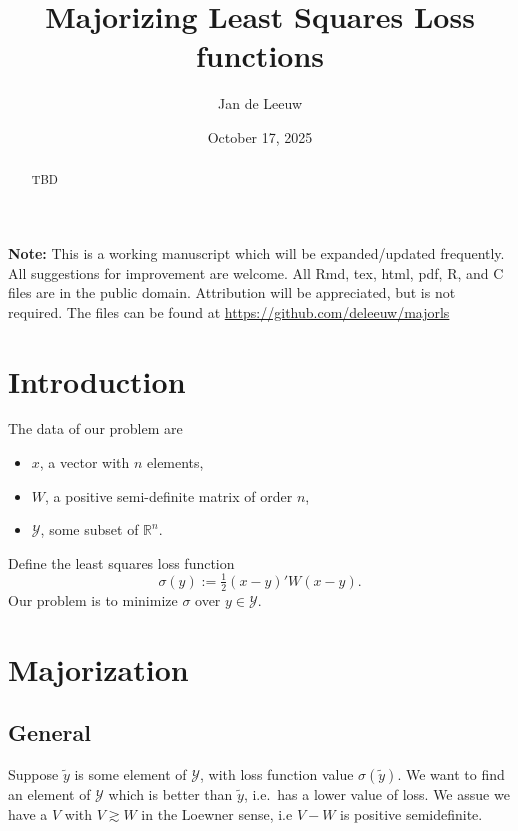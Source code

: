 \documentclass[
  12pt,
  letterpaper,
  DIV=11,
  numbers=noendperiod]{scrartcl}
\title{Majorizing Least Squares Loss functions}
\author{Jan de Leeuw}
\date{October 17, 2025}
\providecommand{\tightlist}{%
  \setlength{\itemsep}{0pt}\setlength{\parskip}{0pt}}
\newcommand{\sectionbreak}{\clearpage}
\renewcommand*\contentsname{Table of contents}
\newcommand\contentsname{Table of contents}
\theoremstyle{plain}
\theoremstyle{remark}
\begin{document}
\maketitle
\begin{abstract}
TBD
\end{abstract}

\renewcommand*\contentsname{Table of contents}
{
\hypersetup{linkcolor=}
\setcounter{tocdepth}{3}
\tableofcontents
}

\sectionbreak

\textbf{Note:} This is a working manuscript which will be
expanded/updated frequently. All suggestions for improvement are
welcome. All Rmd, tex, html, pdf, R, and C files are in the public
domain. Attribution will be appreciated, but is not required. The files
can be found at \url{https://github.com/deleeuw/majorls}

\sectionbreak

\section{Introduction}\label{introduction}

The data of our problem are

\begin{itemize}
\tightlist
\item
  \(x\), a vector with \(n\) elements,
\item
  \(W\), a positive semi-definite matrix of order \(n\),
\item
  \(\mathcal{Y}\), some subset of \(\mathbb{R}^n\).
\end{itemize}

Define the least squares loss function \[
\sigma(y):=\tfrac12(x-y)'W(x-y).
\] Our problem is to minimize \(\sigma\) over \(y\in\mathcal{Y}\).

\sectionbreak

\section{Majorization}\label{majorization}

\subsection{General}\label{general}

Suppose \(\tilde y\) is some element of \(\mathcal{Y}\), with loss
function value \(\sigma(\tilde y)\). We want to find an element of
\(\mathcal{Y}\) which is better than \(\tilde y\), i.e.~has a lower
value of loss. We assue we have a \(V\) with \(V\gtrsim W\) in the
Loewner sense, i.e \(V-W\) is positive semidefinite.
\end{document}
